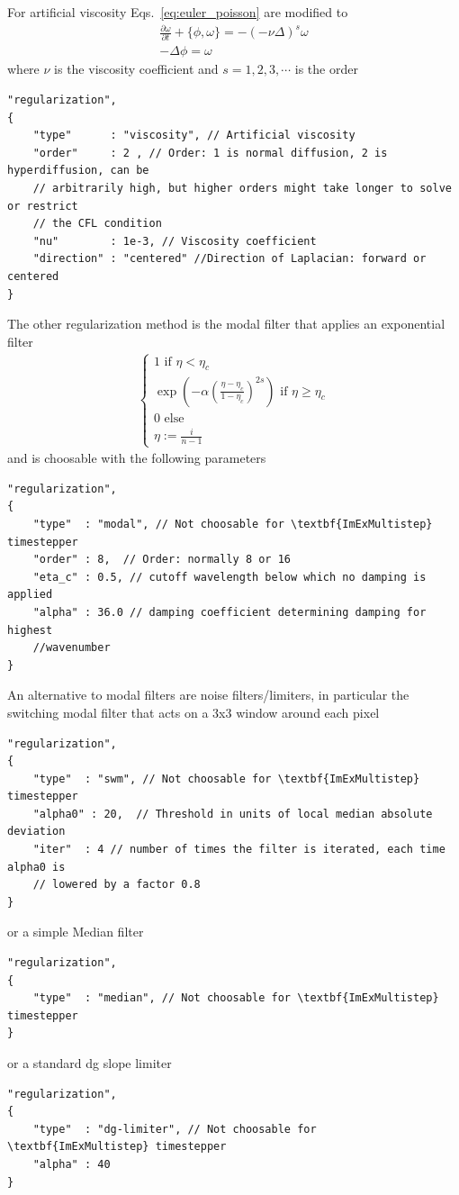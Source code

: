 For artificial viscosity Eqs.~\eqref{eq:euler_poisson} are modified to
\begin{subequations}
\begin{align}
    \frac{\partial \omega}{\partial t} + \{ \phi, \omega\} = -(-\nu \Delta)^s \omega\\
 -\Delta \phi = \omega
\end{align}
\label{eq:euler_poisson_viscous}
\end{subequations}
where $\nu$ is the viscosity coefficient and $s=1,2,3,\cdots$ is the order
\begin{verbatim}
"regularization",
{
    "type"      : "viscosity", // Artificial viscosity
    "order"     : 2 , // Order: 1 is normal diffusion, 2 is hyperdiffusion, can be
    // arbitrarily high, but higher orders might take longer to solve or restrict
    // the CFL condition
    "nu"        : 1e-3, // Viscosity coefficient
    "direction" : "centered" //Direction of Laplacian: forward or centered
}
\end{verbatim}
The other regularization method is the modal filter that applies an exponential filter
\begin{align}
    \begin{cases}
    1 \text{ if } \eta < \eta_c \\
    \exp\left( -\alpha  \left(\frac{\eta-\eta_c}{1-\eta_c} \right)^{2s}\right) \text { if } \eta \geq \eta_c \\
    0 \text{ else} \\
    \eta := \frac{i}{n-1}
    \end{cases}
\end{align}
and is choosable with the following parameters
\begin{verbatim}
"regularization",
{
    "type"  : "modal", // Not choosable for \textbf{ImExMultistep} timestepper
    "order" : 8,  // Order: normally 8 or 16
    "eta_c" : 0.5, // cutoff wavelength below which no damping is applied
    "alpha" : 36.0 // damping coefficient determining damping for highest
    //wavenumber
}
\end{verbatim}
An alternative to modal filters are noise filters/limiters, in particular the
switching modal filter that acts on a 3x3 window around each pixel
\begin{verbatim}
"regularization",
{
    "type"  : "swm", // Not choosable for \textbf{ImExMultistep} timestepper
    "alpha0" : 20,  // Threshold in units of local median absolute deviation
    "iter"  : 4 // number of times the filter is iterated, each time alpha0 is
    // lowered by a factor 0.8
}
\end{verbatim}
or a simple Median filter
\begin{verbatim}
"regularization",
{
    "type"  : "median", // Not choosable for \textbf{ImExMultistep} timestepper
}
\end{verbatim}
or a standard dg slope limiter
\begin{verbatim}
"regularization",
{
    "type"  : "dg-limiter", // Not choosable for \textbf{ImExMultistep} timestepper
    "alpha" : 40
}
\end{verbatim}

